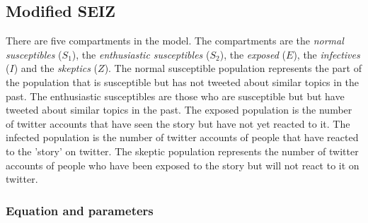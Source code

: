 \documentclass{article}
\begin{document}
\subsection{Modified SEIZ}
There are five compartments in the model. The compartments are the \textit{normal susceptibles} ($S_1$), the \textit{enthusiastic susceptibles} ($S_2$), the \textit{exposed} ($E$), the \textit{infectives} ($I$) and the \textit{skeptics} ($Z$). The normal susceptible population represents the part of the population that is susceptible but has not tweeted about similar topics in the past. The enthusiastic susceptibles are those who are susceptible but but have tweeted about similar topics in the past. The exposed population is the number of twitter accounts that have seen the story but have not yet reacted to it. The infected population is the number of twitter accounts of people that have reacted to the 'story' on twitter. The skeptic population represents the number of twitter accounts of people who have been exposed to the story but will not react to it on twitter. 
\begin{center}
    

\end{center}
\subsubsection{Equation and parameters}
\end{document}
